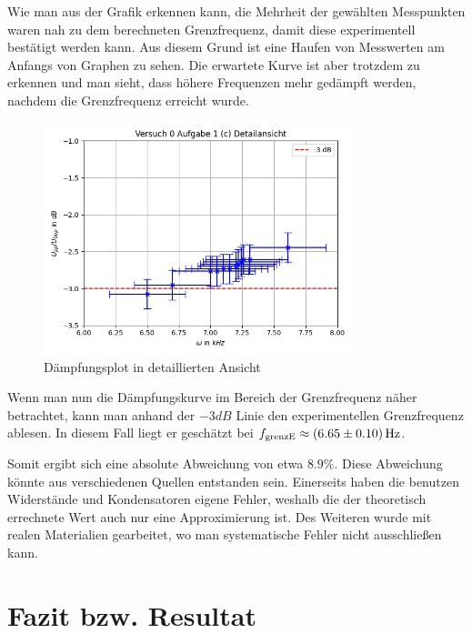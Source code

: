 \documentclass{article}
\begin{document}
\begin{enumerate}[label=\alph*]
        Wie man aus der Grafik erkennen kann, die Mehrheit der gewählten Messpunkten waren nah zu dem 
         berechneten Grenzfrequenz, damit diese experimentell bestätigt werden kann. Aus diesem Grund ist eine Haufen von Messwerten am Anfangs von Graphen
         zu sehen. Die erwartete Kurve ist aber trotzdem zu erkennen und man sieht, dass höhere Frequenzen mehr gedämpft werden, nachdem die Grenzfrequenz erreicht wurde.  
         
         
         \begin{figure}[H]
             \centering
             \includegraphics[width=0.8\textwidth]{figs/versuch0_1cdet}
             \caption{Dämpfungsplot in detaillierten Ansicht}
             \label{0_1_(c)_Dämpfung_detail}
         \end{figure}
         
         Wenn man nun die Dämpfungskurve im Bereich der Grenzfrequenz näher betrachtet, kann man anhand der $-3dB$ Linie den experimentellen Grenzfrequenz ablesen. In diesem Fall liegt er geschätzt bei $f_{\text{grenzE}} \approx \SI{6.65 \pm 0.1}{\hertz}$. 
         
        Somit ergibt sich eine absolute Abweichung von etwa $8.9 \% $. Diese Abweichung könnte aus verschiedenen Quellen entstanden sein. Einerseits haben die benutzen Widerstände und Kondensatoren eigene Fehler, weshalb die der theoretisch errechnete Wert auch nur eine Approximierung ist. Des Weiteren wurde mit realen Materialien gearbeitet, wo man systematische Fehler nicht ausschließen kann.
         
        \end{enumerate}

        \section{Fazit bzw. Resultat}
        
\end{document}
